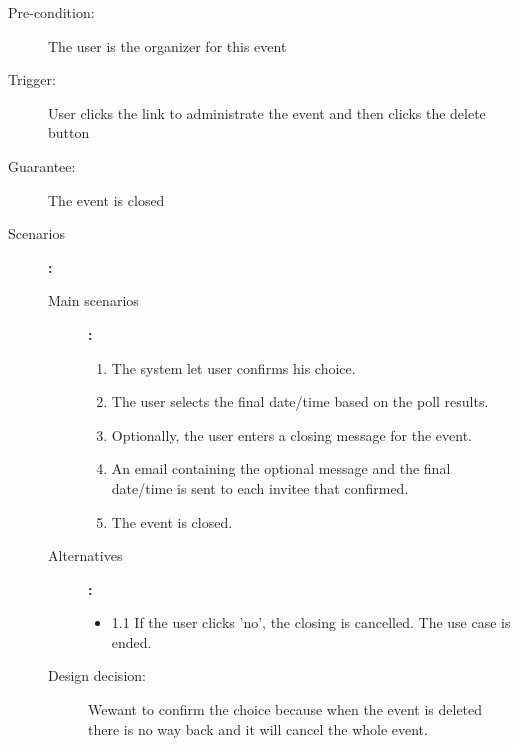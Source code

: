 \begin{description}
	\item[Pre-condition:] The user is the organizer for this event
	\item[Trigger:] User clicks the link to administrate the event and then clicks the delete button
	\item[Guarantee:] The event is closed
	\item[Scenarios]\textbf{:}\\
				\begin{description}
					\item[Main scenarios]\textbf{:}\\
								\begin{enumerate}
									\item The system let user confirms his choice.
									\item The user selects the final date/time based on the poll results.
									\item Optionally, the user enters a closing message for the event.
									\item An email containing the optional message and the final date/time is sent to each invitee that confirmed.
									\item The event is closed.
								\end{enumerate}
					\item[Alternatives]\textbf{:}\\
								\begin{itemize}
									\item 1.1 If the user clicks 'no', the closing is cancelled. The use case is ended.
								\end{itemize}
					\item[Design decision:] Wewant to confirm the choice because when the event is deleted there is no way back and it will cancel the whole event.
					
				\end{description}
\end{description}

